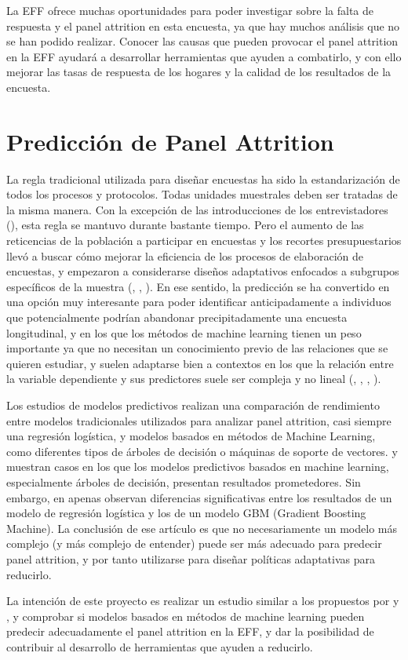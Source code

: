 La EFF ofrece muchas oportunidades para poder investigar sobre la falta de respuesta y el panel attrition en esta encuesta, ya que hay muchos análisis que no se han podido realizar. Conocer las causas que pueden provocar el panel attrition en la EFF ayudará a desarrollar herramientas que ayuden a combatirlo, y con ello mejorar las tasas de respuesta de los hogares y la calidad de los resultados de la encuesta.

\section{Predicción de Panel Attrition}

La regla tradicional utilizada para diseñar encuestas ha sido la estandarización de todos los procesos y protocolos. Todas unidades muestrales deben ser tratadas de la misma manera. Con la excepción de las introducciones de los entrevistadores (\cite{groves1992understanding}), esta regla se mantuvo durante bastante tiempo. Pero el aumento de las reticencias de la población a participar en encuestas y los recortes presupuestarios llevó a buscar cómo mejorar la eficiencia de los procesos de elaboración de encuestas, y empezaron a considerarse diseños adaptativos enfocados a subgrupos específicos de la muestra (\cite{groves2006responsive}, \cite{lynn2014targeted}, \cite{lynn2017standardised}). En ese sentido, la predicción se ha convertido en una opción muy interesante para poder identificar anticipadamente a individuos que potencialmente podrían abandonar precipitadamente una encuesta longitudinal, y en los que los métodos de machine learning tienen un peso importante ya que no necesitan un conocimiento previo de las relaciones que se quieren estudiar, y suelen adaptarse bien a contextos en los que la relación entre la variable dependiente y sus predictores suele ser compleja y no lineal (\cite{buskirk2018introduction}, \cite{kern2019tree}, \cite{kern2021predicting}, \cite{jankowsky2022validation}).

Los estudios de modelos predictivos realizan una comparación de rendimiento entre modelos tradicionales utilizados para analizar panel attrition, casi siempre una regresión logística, y modelos basados en métodos de Machine Learning, como diferentes tipos de árboles de decisión o máquinas de soporte de vectores. \cite{kern2019tree} y \cite{kern2021predicting} muestran casos en los que los modelos predictivos basados en machine learning, especialmente árboles de decisión, presentan resultados prometedores. Sin embargo, en \cite{jankowsky2022validation} apenas observan diferencias significativas entre los resultados de un modelo de regresión logística y los de un modelo GBM (Gradient Boosting Machine). La conclusión de ese artículo es que no necesariamente un modelo más complejo (y más complejo de entender) puede ser más adecuado para predecir panel attrition, y por tanto utilizarse para diseñar políticas adaptativas para reducirlo.

La intención de este proyecto es realizar un estudio similar a los propuestos por \cite{kern2021predicting} y \cite{jankowsky2022validation}, y comprobar si modelos basados en métodos de machine learning pueden predecir adecuadamente el panel attrition en la EFF, y dar la posibilidad de contribuir al desarrollo de herramientas que ayuden a reducirlo.